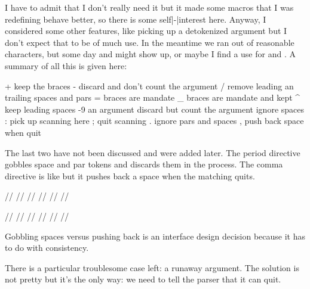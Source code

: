 \typebuffer[example][option=TEX] \startpacked \getbuffer[example] \stoppacked

I have to admit that I don't really need it but it made some macros that I was
redefining behave better, so there is some self|-|interest here. Anyway, I
considered some other features, like picking up a detokenized argument but I
don't expect that to be of much use. In the meantime we ran out of reasonable
characters, but some day  and \type {#!} might show up, or maybe I find
a use for \type {#<} and \type {#>}. A summary of all this is given here:

\starttabulate[|T|i2l|]
\FL
\NC +   \NC keep the braces \NC \NR
\NC -   \NC discard and don't count the argument \NC \NR
\NC /   \NC remove leading an trailing spaces and pars \NC \NR
\NC =   \NC braces are mandate \NC \NR
\NC _   \NC braces are mandate and kept \NC \NR
\NC ^   \NC keep leading spaces \NC \NR
\ML
{}-9 \NC an argument \NC \NR
{}   \NC discard but count the argument \NC \NR
\ML
\NC *   \NC ignore spaces \NC \NR
\NC :   \NC pick up scanning here  \NC \NR
\NC ;   \NC quit scanning \NC \NR
\ML
\NC .   \NC ignore pars and spaces \NC \NR
\NC ,   \NC push back space when quit \NC \NR
\LL
\stoptabulate

The last two have not been discussed and were added later. The period
directive gobbles space and par tokens and discards them in the
process. The comma directive is like \type {*} but it pushes back a space
when the matching quits.

\startbuffer
\tolerant{} %
\tolerant\def\FooB[#1]#,[#2]{(#1/#2)} %

/\FooA/ /\FooA / /\FooA[1]/ /\FooA[!] / /\FooA[1] [2]/ /\FooA[1] [2] /\par
/\FooB/ /\FooB / /\FooB[1]/ /\FooB[!] / /\FooB[1] [2]/ /\FooB[1] [2] /\par
\stopbuffer

\typebuffer[example][option=TEX] \startpacked \getbuffer[example] \stoppacked

Gobbling spaces versus pushing back is an interface design decision because it
has to do with consistency.

\stopsectionlevel

\startsectionlevel[title=Runaway arguments]

There is a particular troublesome case left: a runaway argument. The solution is
not pretty but it's the only way: we need to tell the parser that it can quit.

